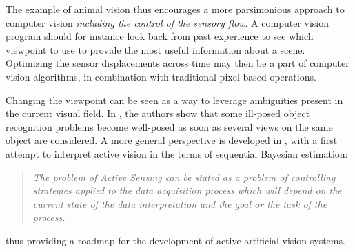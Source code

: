 \documentclass[12pt,twoside,openright]{article}
\begin{document}

%

The example of animal vision thus encourages a more parsimonious approach to computer vision \emph{including the control of the sensory flow}. 
A computer vision program should for instance look back from past experience to see which viewpoint to use to provide the most useful information about a scene. Optimizing the sensor displacements across time may then be a part of computer vision algorithms, in combination with traditional pixel-based operations. 

Changing the viewpoint can be seen as a way to leverage ambiguities present in the current visual field. In \cite{aloimonos1988active}, the authors show that some ill-posed object recognition problems become well-posed as soon as several views on the  same object are considered. 
A more general perspective is developed in \cite{bajcsy1988active}, with a first attempt to interpret active vision in the terms of sequential Bayesian estimation:
\begin{quote}
	\emph{The problem  of Active Sensing can be stated as a problem of controlling strategies 
		applied to the data acquisition process which will depend on the current state 
		of the data interpretation and  the  goal  or the  task of  the  process.}
\end{quote}
thus providing a roadmap for the development of active artificial vision systems.
\end{document}
